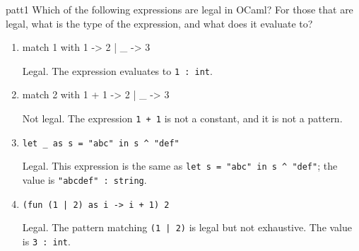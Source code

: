 %
%
%
\exercises

\begin{exercise}{patt1}
Which of the following expressions are legal in OCaml?  For those that are legal, what is the type
of the expression, and what does it evaluate to?

\begin{enumerate}
\item 

\begin{ocamllistinge}
match 1 with
   1 -> 2
 | _ -> 3
\end{ocamllistinge}

\begin{answer}\ifanswers
Legal.  The expression evaluates to \hbox{\lstinline/1 : int/}.
\fi\end{answer}

\item

\begin{ocamllistinge}
match 2 with
   1 + 1 -> 2
 | _ -> 3
\end{ocamllistinge}

\begin{answer}\ifanswers
Not legal.  The expression \hbox{\lstinline/1 + 1/} is not a constant, and it is not a pattern.
\fi\end{answer}

\item \lstinline!let _ as s = "abc" in s ^ "def"!

\begin{answer}\ifanswers
Legal.  This expression is the same as \hbox{\lstinline/let s = "abc" in s ^ "def"/}; the value
is \hbox{\lstinline/"abcdef" : string/}.
\fi\end{answer}

\item \lstinline!(fun (1 | 2) as i -> i + 1) 2!

\begin{answer}\ifanswers
Legal.  The pattern matching \hbox{\lstinline/(1 | 2)/} is legal but not exhaustive.  The value is
\hbox{\lstinline/3 : int/}.
\fi\end{answer}
\end{enumerate}
\end{exercise}

